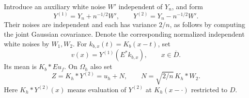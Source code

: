 \documentclass[11pt]{article}
\theoremstyle{remark}
\begin{document}
Introduce an auxiliary white noise $W'$ independent of $Y_n$, and form
\begin{equation}\label{eq:split}
 Y^{(1)}=Y_n+n^{-1/2}W',\qquad
 Y^{(2)}=Y_n-n^{-1/2}W'.
\end{equation}
Their noises are independent and each has variance $2/n$, as follows by computing the joint Gaussian covariance. Denote the corresponding normalized independent white noises by $W_1,W_2$. For $k_{b,x}(t)=K_b(x-t)$, set
\begin{equation}\label{eq:pilot}
 v(x)=Y^{(1)}(E^*k_{b,x}),\qquad x\in\overline D.
\end{equation}
Its mean is $K_b*Eu_f$. On $\Omega_h$ also set
\begin{equation}\label{eq:Z}
 Z=K_h*Y^{(2)}=u_h+N,\qquad N=\sqrt{2/n}\,K_h*W_2.
\end{equation}
Here $K_h*Y^{(2)}(x)$ means evaluation of $Y^{(2)}$ at $K_h(x-\cdot)$ restricted to $D$.

\end{document}
